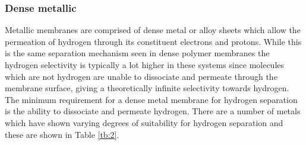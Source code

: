 \subsubsection{Dense metallic}
Metallic membranes are comprised of dense metal or alloy sheets which allow the permeation 
of hydrogen through its constituent electrons and protons. While this is the same separation 
mechanism seen in dense polymer membranes the hydrogen selectivity is typically a lot higher 
in these systems since molecules which are not hydrogen are unable to dissociate and permeate 
through the membrane surface, giving a theoretically infinite selectivity towards hydrogen. 
The minimum requirement for a dense metal membrane for hydrogen separation is the ability to 
dissociate and permeate hydrogen. There are a number of metals which have shown varying 
degrees of suitability for hydrogen separation and these are shown in Table \ref{tb:2}.



